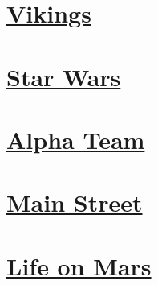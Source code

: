 \section*{\centering \hyperref[contents]{Vikings}}\label{image:Vikings}
\begin{figure}[H]\begin{flushleft}
\end{flushleft}\end{figure}
\vspace{2.5cm}
\section*{\centering \hyperref[contents]{Star Wars}}\label{image:Star Wars}
\begin{figure}[H]\begin{flushleft}
\end{flushleft}\end{figure}
\vspace{2.5cm}
\section*{\centering \hyperref[contents]{Alpha Team}}\label{image:Alpha Team}
\begin{figure}[H]\begin{flushleft}
\end{flushleft}\end{figure}
\vspace{2.5cm}
\section*{\centering \hyperref[contents]{Main Street}}\label{image:Main Street}
\begin{figure}[H]\begin{flushleft}
\end{flushleft}\end{figure}
\vspace{2.5cm}
\section*{\centering \hyperref[contents]{Life on Mars}}\label{image:Life on Mars}
\begin{figure}[H]\begin{flushleft}
\end{flushleft}\end{figure}
\vspace{2.5cm}
